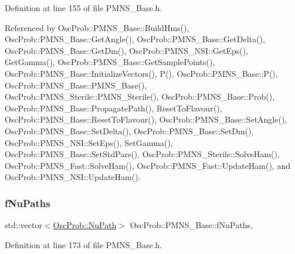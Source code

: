 Definition at line 155 of file P\+M\+N\+S\+\_\+\+Base.\+h.



Referenced by Osc\+Prob\+::\+P\+M\+N\+S\+\_\+\+Base\+::\+Build\+Hms(), Osc\+Prob\+::\+P\+M\+N\+S\+\_\+\+Base\+::\+Get\+Angle(), Osc\+Prob\+::\+P\+M\+N\+S\+\_\+\+Base\+::\+Get\+Delta(), Osc\+Prob\+::\+P\+M\+N\+S\+\_\+\+Base\+::\+Get\+Dm(), Osc\+Prob\+::\+P\+M\+N\+S\+\_\+\+N\+S\+I\+::\+Get\+Eps(), Get\+Gamma(), Osc\+Prob\+::\+P\+M\+N\+S\+\_\+\+Base\+::\+Get\+Sample\+Points(), Osc\+Prob\+::\+P\+M\+N\+S\+\_\+\+Base\+::\+Initialize\+Vectors(), P(), Osc\+Prob\+::\+P\+M\+N\+S\+\_\+\+Base\+::\+P(), Osc\+Prob\+::\+P\+M\+N\+S\+\_\+\+Base\+::\+P\+M\+N\+S\+\_\+\+Base(), Osc\+Prob\+::\+P\+M\+N\+S\+\_\+\+Sterile\+::\+P\+M\+N\+S\+\_\+\+Sterile(), Osc\+Prob\+::\+P\+M\+N\+S\+\_\+\+Base\+::\+Prob(), Osc\+Prob\+::\+P\+M\+N\+S\+\_\+\+Base\+::\+Propagate\+Path(), Reset\+To\+Flavour(), Osc\+Prob\+::\+P\+M\+N\+S\+\_\+\+Base\+::\+Reset\+To\+Flavour(), Osc\+Prob\+::\+P\+M\+N\+S\+\_\+\+Base\+::\+Set\+Angle(), Osc\+Prob\+::\+P\+M\+N\+S\+\_\+\+Base\+::\+Set\+Delta(), Osc\+Prob\+::\+P\+M\+N\+S\+\_\+\+Base\+::\+Set\+Dm(), Osc\+Prob\+::\+P\+M\+N\+S\+\_\+\+N\+S\+I\+::\+Set\+Eps(), Set\+Gamma(), Osc\+Prob\+::\+P\+M\+N\+S\+\_\+\+Base\+::\+Set\+Std\+Pars(), Osc\+Prob\+::\+P\+M\+N\+S\+\_\+\+Sterile\+::\+Solve\+Ham(), Osc\+Prob\+::\+P\+M\+N\+S\+\_\+\+Fast\+::\+Solve\+Ham(), Osc\+Prob\+::\+P\+M\+N\+S\+\_\+\+Fast\+::\+Update\+Ham(), and Osc\+Prob\+::\+P\+M\+N\+S\+\_\+\+N\+S\+I\+::\+Update\+Ham().

\mbox{\label{classOscProb_1_1PMNS__Base_a69db9d57e12fc7cbe0431bc6c18fac93}} 
\subsubsection{\texorpdfstring{f\+Nu\+Paths}{fNuPaths}}
{\footnotesize\ttfamily std\+::vector$<$\hyperlink{structOscProb_1_1NuPath}{Osc\+Prob\+::\+Nu\+Path}$>$ Osc\+Prob\+::\+P\+M\+N\+S\+\_\+\+Base\+::f\+Nu\+Paths\hspace{0.3cm}{\ttfamily [protected]}, {\ttfamily [inherited]}}



Definition at line 173 of file P\+M\+N\+S\+\_\+\+Base.\+h.



